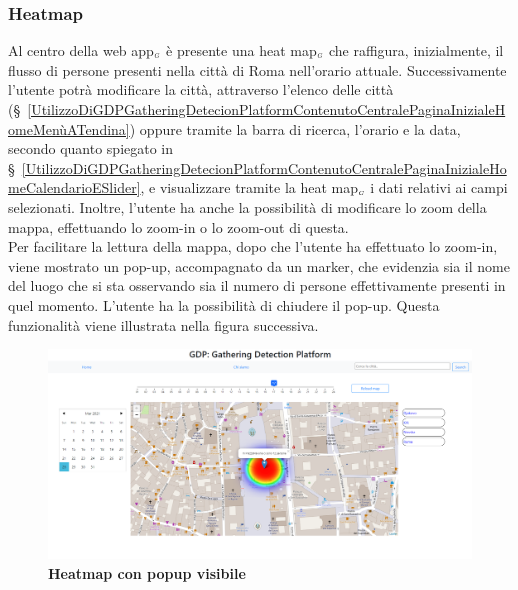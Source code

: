 \subsubsection{Heatmap}\label{UtilizzoDiGDPGatheringDetecionPlatformContenutoCentralePaginaInizialeHomeHeatmap}
Al centro della web app$_{\scaleto{G}{3pt}}$ è presente una heat map$_{\scaleto{G}{3pt}}$ che raffigura, inizialmente, il flusso di persone presenti nella città di Roma nell'orario attuale. Successivamente l'utente potrà modificare la città, attraverso l'elenco delle città (\S~\ref{UtilizzoDiGDPGatheringDetecionPlatformContenutoCentralePaginaInizialeHomeMenùATendina}) oppure tramite la barra di ricerca, l'orario e la data, secondo quanto spiegato in \S~\ref{UtilizzoDiGDPGatheringDetecionPlatformContenutoCentralePaginaInizialeHomeCalendarioESlider}, e visualizzare tramite la heat map$_{\scaleto{G}{3pt}}$ i dati relativi ai campi selezionati. Inoltre, l'utente ha anche la possibilità di modificare lo zoom della mappa, effettuando lo zoom-in o lo zoom-out di questa. \\
Per facilitare la lettura della mappa, dopo che l'utente ha effettuato lo zoom-in, viene mostrato un pop-up, accompagnato da un marker, che evidenzia sia il nome del luogo che si sta osservando sia il numero di persone effettivamente presenti in quel momento. L'utente ha la possibilità di chiudere il pop-up. Questa funzionalità viene illustrata nella figura successiva.

\begin{center}
	\begin{figure}[H]
		\centering\includegraphics[width=0.9\linewidth]{../immagini/manualeUtente/popup.png}
		\caption{\textbf{\textbf{\textbf{Heatmap con popup visibile}}}}
	\end{figure}
\end{center} 

